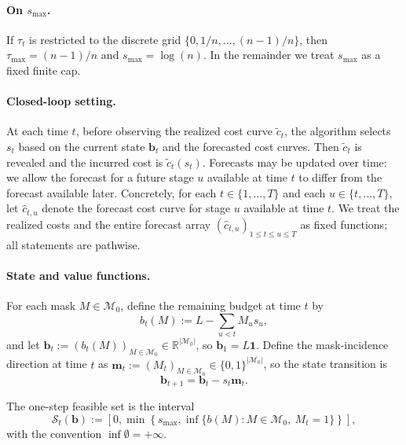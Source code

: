 \documentclass[11pt]{article}
\newcommand{\R}{\mathbb{R}}
\newcommand{\1}{\mathbf{1}}
\newcommand{\mcal}{\mathcal{M}}
\newcommand{\scalt}{\mathcal{S}_{t}}
\begin{document}
\paragraph{On $s_{\max}$.}
If $\tau_t$ is restricted to the discrete grid $\{0,1/n,\dots,(n-1)/n\}$, then $\tau_{\max}=(n-1)/n$ and $s_{\max}=\log({n})$.
In the remainder we treat $s_{\max}$ as a fixed finite cap.

\paragraph{Closed-loop setting.}
At each time $t$, before observing the realized cost curve $\tilde{c}_t$, the algorithm selects $s_t$ based on the current state $\mathbf{b}_t$ and the forecasted cost curves.
Then $\tilde{c}_t$ is revealed and the incurred cost is $\tilde{c}_t(s_t)$.
Forecasts may be updated over time: we allow the forecast for a future stage $u$ available at time $t$ to differ from the forecast available later.
Concretely, for each $t \in \{1,\dots,T\}$ and each $u \in \{t,\dots,T\}$, let $\hat{c}_{t,u}$ denote the forecast cost curve for stage $u$ available at time $t$.
We treat the realized costs and the entire forecast array $(\hat{c}_{t,u})_{1 \leq t \leq u \leq T}$ as fixed functions; all statements are pathwise.

\paragraph{State and value functions.}
For each mask $M \in \mcal_{0}$, define the remaining budget at time $t$ by
\begin{equation}
  \label{eq:budget-state}
  b_t(M) := L - \sum_{u < t} M_u s_u,
\end{equation}
and let $\mathbf{b}_t := (b_t(M))_{M \in \mcal_{0}} \in \R^{|\mcal_{0}|}$, so $\mathbf{b}_1 = L \1$.
Define the mask-incidence direction at time $t$ as $\mathbf{m}_t := (M_t)_{M \in \mcal_{0}} \in \{0,1\}^{|\mcal_{0}|}$, so the state transition is
\begin{equation}
  \label{eq:state-transition}
  \mathbf{b}_{t+1} = \mathbf{b}_t - s_t \mathbf{m}_t.
\end{equation}

The one-step feasible set is the interval
\begin{equation}
  \label{eq:Scal-def}
  \scalt(\mathbf{b})
  := \left[0, \min\left\{s_{\max}, \inf\{b(M) : M \in \mcal_{0},\ M_t = 1\}\right\}\right],
\end{equation}
with the convention $\inf\emptyset = +\infty$.
\end{document}
